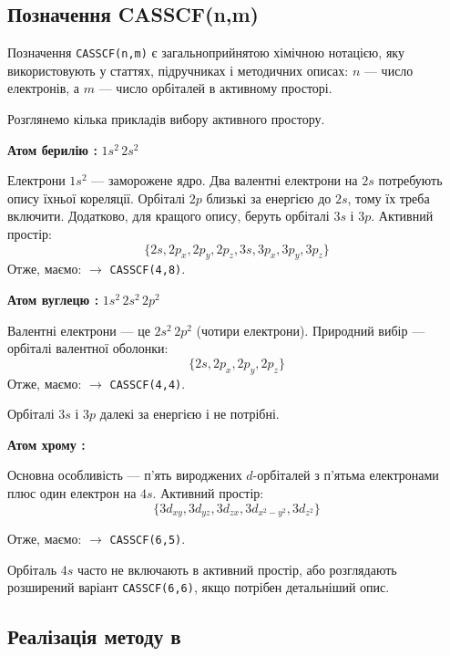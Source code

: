 \subsection{Позначення CASSCF(n,m)}

Позначення \texttt{CASSCF(n,m)} є загальноприйнятою хімічною нотацією, яку використовують у статтях, підручниках і методичних описах: $n$ --- число електронів, а $m$ --- число орбіталей в активному просторі.

Розглянемо кілька прикладів вибору активного простору.

\textbf{Атом берилію :} $1s^2\, 2s^2$

Електрони $1s^2$ --- заморожене ядро. Два валентні електрони на $2s$
потребують опису їхньої кореляції. Орбіталі $2p$ близькі за енергією
до $2s$, тому їх треба включити. Додатково, для кращого опису,
беруть орбіталі $3s$ і $3p$. Активний простір:
\[
\{2s, 2p_x, 2p_y, 2p_z, 3s, 3p_x, 3p_y, 3p_z\}
\]
Отже, маємо:
 $\rightarrow$ \texttt{CASSCF(4,8)}.


\textbf{Атом вуглецю :} $1s^2\, 2s^2\, 2p^2$

Валентні електрони --- це $2s^2\, 2p^2$ (чотири електрони).
Природний вибір --- орбіталі валентної оболонки:
\[
\{2s, 2p_x, 2p_y, 2p_z\}
\]
Отже, маємо:
 $\rightarrow$ \texttt{CASSCF(4,4)}.

Орбіталі $3s$ і $3p$ далекі за енергією і не потрібні.

\textbf{Атом хрому :} 

Основна особливість --- п'ять вироджених $d$-орбіталей з п'ятьма
електронами плюс один електрон на $4s$. Активний простір:
\[
\{3d_{xy}, 3d_{yz}, 3d_{zx}, 3d_{x^2-y^2}, 3d_{z^2}\}
\]

Отже, маємо:
 $\rightarrow$ \texttt{CASSCF(6,5)}.

Орбіталь $4s$ часто не включають в активний простір, або розглядають
розширений варіант \texttt{CASSCF(6,6)}, якщо потрібен детальніший опис.



\subsection{Реалізація методу в \PySCF}


